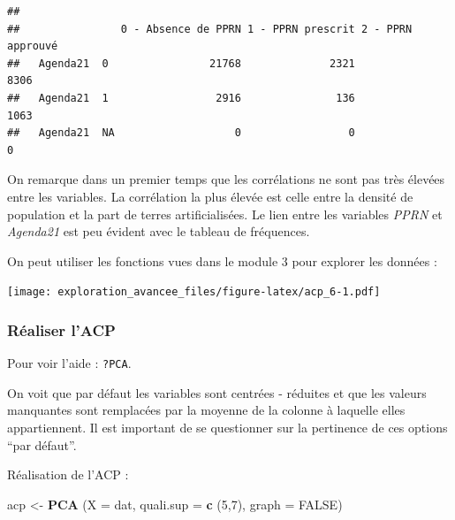 \documentclass[]{book}
\newenvironment{Shaded}{\begin{snugshade}}{\end{snugshade}}
\newcommand{\DataTypeTok}[1]{\textcolor[rgb]{0.13,0.29,0.53}{#1}}
\newcommand{\DecValTok}[1]{\textcolor[rgb]{0.00,0.00,0.81}{#1}}
\newcommand{\KeywordTok}[1]{\textcolor[rgb]{0.13,0.29,0.53}{\textbf{#1}}}
\newcommand{\NormalTok}[1]{#1}
\newcommand{\OperatorTok}[1]{\textcolor[rgb]{0.81,0.36,0.00}{\textbf{#1}}}
\newcommand{\OtherTok}[1]{\textcolor[rgb]{0.56,0.35,0.01}{#1}}
\newcommand{\StringTok}[1]{\textcolor[rgb]{0.31,0.60,0.02}{#1}}
\begin{document}
\begin{verbatim}
##               
##                0 - Absence de PPRN 1 - PPRN prescrit 2 - PPRN approuvé
##   Agenda21  0                21768              2321              8306
##   Agenda21  1                 2916               136              1063
##   Agenda21  NA                   0                 0                 0
\end{verbatim}

On remarque dans un premier temps que les corrélations ne sont pas très élevées entre les variables. La corrélation la plus élevée est celle entre la densité de population et la part de terres artificialisées.
Le lien entre les variables \emph{PPRN} et \emph{Agenda21} est peu évident avec le tableau de fréquences.

On peut utiliser les fonctions vues dans le module 3 pour explorer les données :

\begin{Shaded}
\end{Shaded}

\texttt{[image: exploration\_avancee\_files/figure-latex/acp\_6-1.pdf]}

\hypertarget{realiser-lacp}{%
\subsubsection{Réaliser l'ACP}\label{realiser-lacp}}

Pour voir l'aide : \texttt{?PCA}.

On voit que par défaut les variables sont centrées - réduites et que les valeurs manquantes sont remplacées par la moyenne de la colonne à laquelle elles appartiennent. Il est important de se questionner sur la pertinence de ces options ``par défaut''.

Réalisation de l'ACP :

\begin{Shaded}
\begin{Highlighting}[]
\NormalTok{acp <-}\StringTok{ }\KeywordTok{PCA}\NormalTok{ (}\DataTypeTok{X =}\NormalTok{ dat, }\DataTypeTok{quali.sup =} \KeywordTok{c}\NormalTok{ (}\DecValTok{5}\NormalTok{,}\DecValTok{7}\NormalTok{), }\DataTypeTok{graph =} \OtherTok{FALSE}\NormalTok{)}
\end{Highlighting}
\end{Shaded}
\end{document}
